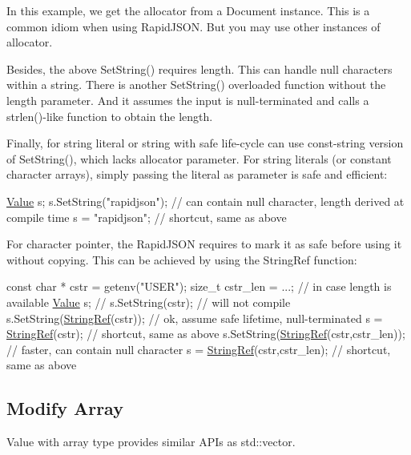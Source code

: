 In this example, we get the allocator from a {\ttfamily Document} instance. This is a common idiom when using Rapid\+J\+S\+ON. But you may use other instances of allocator.

Besides, the above {\ttfamily Set\+String()} requires length. This can handle null characters within a string. There is another {\ttfamily Set\+String()} overloaded function without the length parameter. And it assumes the input is null-\/terminated and calls a {\ttfamily strlen()}-\/like function to obtain the length.

Finally, for string literal or string with safe life-\/cycle can use const-\/string version of {\ttfamily Set\+String()}, which lacks allocator parameter. For string literals (or constant character arrays), simply passing the literal as parameter is safe and efficient\+:


\begin{DoxyCode}
\hyperlink{class_generic_value}{Value} s;
s.SetString(\textcolor{stringliteral}{"rapidjson"});    \textcolor{comment}{// can contain null character, length derived at compile time}
s = \textcolor{stringliteral}{"rapidjson"};             \textcolor{comment}{// shortcut, same as above}
\end{DoxyCode}


For character pointer, the Rapid\+J\+S\+ON requires to mark it as safe before using it without copying. This can be achieved by using the {\ttfamily String\+Ref} function\+:


\begin{DoxyCode}
\textcolor{keyword}{const} \textcolor{keywordtype}{char} * cstr = getenv(\textcolor{stringliteral}{"USER"});
\textcolor{keywordtype}{size\_t} cstr\_len = ...;                 \textcolor{comment}{// in case length is available}
\hyperlink{class_generic_value}{Value} s;
\textcolor{comment}{// s.SetString(cstr);                  // will not compile}
s.SetString(\hyperlink{struct_generic_string_ref_aa6b9fd9f6aa49405a574c362ba9af6b5}{StringRef}(cstr));          \textcolor{comment}{// ok, assume safe lifetime, null-terminated}
s = \hyperlink{struct_generic_string_ref_aa6b9fd9f6aa49405a574c362ba9af6b5}{StringRef}(cstr);                   \textcolor{comment}{// shortcut, same as above}
s.SetString(\hyperlink{struct_generic_string_ref_aa6b9fd9f6aa49405a574c362ba9af6b5}{StringRef}(cstr,cstr\_len)); \textcolor{comment}{// faster, can contain null character}
s = \hyperlink{struct_generic_string_ref_aa6b9fd9f6aa49405a574c362ba9af6b5}{StringRef}(cstr,cstr\_len);          \textcolor{comment}{// shortcut, same as above}
\end{DoxyCode}
\hypertarget{md_Cadriciel_Commun_Externe_RapidJSON_doc_tutorial.zh-cn_ModifyArray}{}\subsection{Modify Array}\label{md_Cadriciel_Commun_Externe_RapidJSON_doc_tutorial.zh-cn_ModifyArray}
Value with array type provides similar A\+P\+Is as {\ttfamily std\+::vector}.


